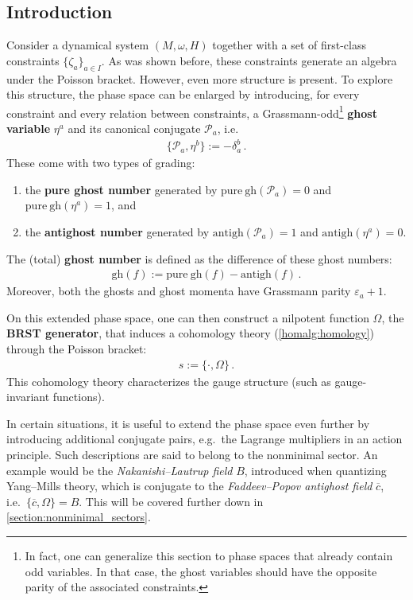\subsection{Introduction}\label{section:brst_introduction}

    Consider a dynamical system $(M,\omega,H)$ together with a set of first-class constraints $\{\zeta_a\}_{a\in I}$. As was shown before, these constraints generate an algebra under the Poisson bracket. However, even more structure is present. To explore this structure, the phase space can be enlarged by introducing, for every constraint and every relation between constraints, a Grassmann-odd\footnote{In fact, one can generalize this section to phase spaces that already contain odd variables. In that case, the ghost variables should have the opposite parity of the associated constraints.} \textbf{ghost variable} $\eta^a$ and its canonical conjugate $\mathcal{P}_a$, i.e.
    \begin{gather}
        \{\mathcal{P}_a,\eta^b\} := -\delta^b_a\,.
    \end{gather}
    These come with two types of grading:
    \begin{enumerate}
        \item the \textbf{pure ghost number} generated by $\mathrm{pure\ gh}(\mathcal{P}_a) = 0$ and $\mathrm{pure\ gh}(\eta^a) = 1$, and
        \item the \textbf{antighost number} generated by $\mathrm{antigh}(\mathcal{P}_a) = 1$ and $\mathrm{antigh}(\eta^a) = 0$.
    \end{enumerate}
    The (total) \textbf{ghost number} is defined as the difference of these ghost numbers:
    \begin{gather}
        \mathrm{gh}(f) := \mathrm{pure\ gh}(f) - \mathrm{antigh}(f)\,.
    \end{gather}
    Moreover, both the ghosts and ghost momenta have Grassmann parity $\varepsilon_a+1$.

    On this extended phase space, one can then construct a nilpotent function $\Omega$, the \textbf{BRST generator}, that induces a cohomology theory (\cref{homalg:homology}) through the Poisson bracket:
    \begin{gather}
        s := \{\cdot,\Omega\}\,.
    \end{gather}
    This cohomology theory characterizes the gauge structure (such as gauge-invariant functions).

    \begin{remark}
        In certain situations, it is useful to extend the phase space even further by introducing additional conjugate pairs, e.g.~the Lagrange multipliers in an action principle. Such descriptions are said to belong to the nonminimal sector. An example would be the \textit{Nakanishi--Lautrup field} $B$, introduced when quantizing Yang--Mills theory, which is conjugate to the \textit{Faddeev--Popov antighost field} $\overline{c}$, i.e.~$\{\overline{c},\Omega\}=B$. This will be covered further down in \cref{section:nonminimal_sectors}.
    \end{remark}

